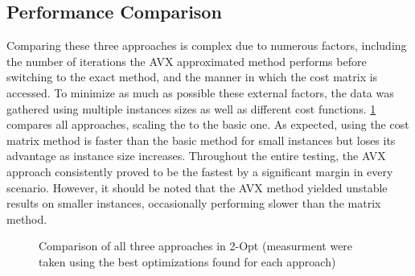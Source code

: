 \subsection{Performance Comparison}

Comparing these three approaches is complex due to numerous factors, including the number of iterations the AVX approximated method performs before switching to the exact method, and the manner in which the cost matrix is accessed.
To minimize as much as possible these external factors, the data was gathered using multiple instances sizes as well as different cost functions.
\figurename{ \ref{fig:avxShowcase}} compares all approaches, scaling the to the basic one.
As expected, using the cost matrix method is faster than the basic method for small instances but loses its advantage as instance size increases.
Throughout the entire testing, the AVX approach consistently proved to be the fastest by a significant margin in every scenario.
However, it should be noted that the AVX method yielded unstable results on smaller instances, occasionally performing slower than the matrix method.

\begin{figure}[H]
    \centering
    \caption{Comparison of all three approaches in 2-Opt (measurment were taken using the best optimizations found for each approach)} \label{fig:avxShowcase}
\end{figure}


